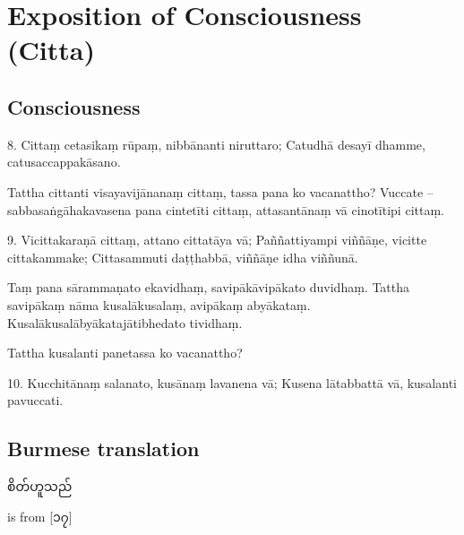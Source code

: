 \chapter{Exposition of Consciousness (Citta)}

\starthere

\section{Consciousness}
8.
Cittaṃ cetasikaṃ rūpaṃ, nibbānanti niruttaro;
Catudhā desayī dhamme, catusaccappakāsano.

Tattha cittanti visayavijānanaṃ cittaṃ, tassa pana ko vacanattho? Vuccate – sabbasaṅgāhakavasena pana cintetīti cittaṃ, attasantānaṃ vā cinotītipi cittaṃ.

9.
Vicittakaraṇā cittaṃ, attano cittatāya vā;
Paññattiyampi viññāṇe, vicitte cittakammake;
Cittasammuti daṭṭhabbā, viññāṇe idha viññunā.

Taṃ pana sārammaṇato ekavidhaṃ, savipākāvipākato duvidhaṃ. Tattha savipākaṃ nāma kusalākusalaṃ, avipākaṃ abyākataṃ. Kusalākusalābyākatajātibhedato tividhaṃ.

Tattha kusalanti panetassa ko vacanattho?

10.
Kucchitānaṃ salanato, kusānaṃ lavanena vā;
Kusena lātabbattā vā, kusalanti pavuccati.

\section{Burmese translation}
စိတ်ဟူသည် \cite{dhammasangani_pali}

 is from [၁၇]